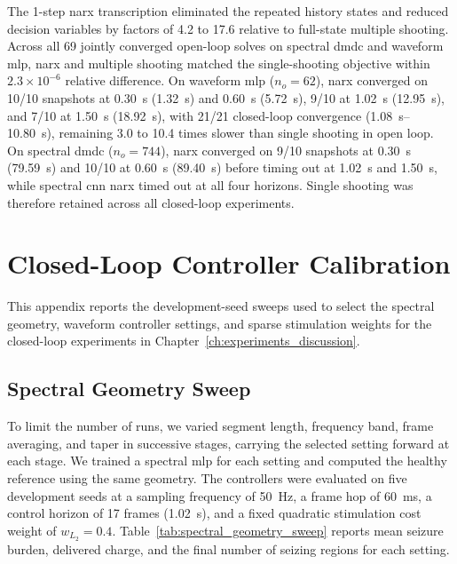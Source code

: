 The 1-step \ac{narx} transcription eliminated the repeated history states and reduced decision variables by factors of \num{4.2} to \num{17.6} relative to full-state multiple shooting.
Across all \num{69} jointly converged open-loop solves on spectral \ac{dmdc} and waveform \ac{mlp}, \ac{narx} and multiple shooting matched the single-shooting objective within $2.3\times 10^{-6}$ relative difference.
On waveform \ac{mlp} ($n_o=62$), \ac{narx} converged on \num{10}/10 snapshots at \SI{0.30}{\second} (\SI{1.32}{\second}) and \SI{0.60}{\second} (\SI{5.72}{\second}), \num{9}/10 at \SI{1.02}{\second} (\SI{12.95}{\second}), and \num{7}/10 at \SI{1.50}{\second} (\SI{18.92}{\second}), with \num{21}/21 closed-loop convergence (\SIrange{1.08}{10.80}{\second}), remaining \num{3.0} to \num{10.4} times slower than single shooting in open loop.
On spectral \ac{dmdc} ($n_o=744$), \ac{narx} converged on \num{9}/10 snapshots at \SI{0.30}{\second} (\SI{79.59}{\second}) and \num{10}/10 at \SI{0.60}{\second} (\SI{89.40}{\second}) before timing out at \SI{1.02}{\second} and \SI{1.50}{\second}, while spectral \ac{cnn} \ac{narx} timed out at all four horizons.
Single shooting was therefore retained across all closed-loop experiments.

\chapter{Closed-Loop Controller Calibration}\label{app:closed_loop_calibration}

This appendix reports the development-seed sweeps used to select the spectral geometry, waveform controller settings, and sparse stimulation weights for the closed-loop experiments in Chapter~\ref{ch:experiments_discussion}.

\section{Spectral Geometry Sweep}\label{sec:spectral_geometry_sweep}

To limit the number of runs, we varied segment length, frequency band, frame averaging, and taper in successive stages, carrying the selected setting forward at each stage.
We trained a spectral \ac{mlp} for each setting and computed the healthy reference using the same geometry.
The controllers were evaluated on five development seeds at a sampling frequency of \SI{50}{\hertz}, a frame hop of \SI{60}{\milli\second}, a control horizon of 17 frames (\SI{1.02}{\second}), and a fixed quadratic stimulation cost weight of \(w_{L_2}=0.4\).
Table~\ref{tab:spectral_geometry_sweep} reports mean seizure burden, delivered charge, and the final number of seizing regions for each setting.

